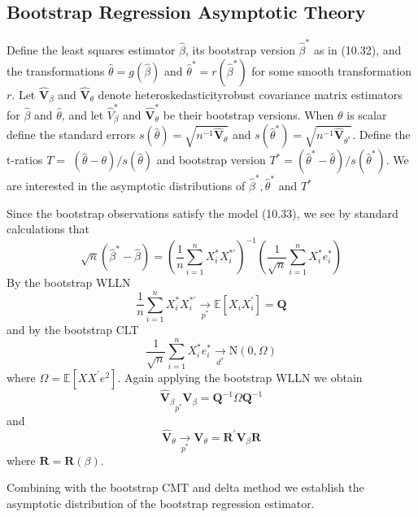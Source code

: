 \documentclass[10pt]{article}
\begin{document}
\subsection{Bootstrap Regression Asymptotic Theory}
Define the least squares estimator $\widehat{\beta}$, its bootstrap version $\widehat{\beta}^{*}$ as in (10.32), and the transformations $\widehat{\theta}=g(\widehat{\beta})$ and $\widehat{\theta}^{*}=r\left(\widehat{\beta}^{*}\right)$ for some smooth transformation $r$. Let $\widehat{\boldsymbol{V}}_{\beta}$ and $\widehat{\boldsymbol{V}}_{\theta}$ denote heteroskedasticityrobust covariance matrix estimators for $\widehat{\beta}$ and $\widehat{\theta}$, and let $\widehat{V}_{\beta}^{*}$ and $\widehat{\boldsymbol{V}}_{\theta}^{*}$ be their bootstrap versions. When $\theta$ is scalar define the standard errors $s(\widehat{\theta})=\sqrt{n^{-1} \widehat{\boldsymbol{V}}_{\theta}}$ and $s\left(\widehat{\theta}^{*}\right)=\sqrt{n^{-1} \widehat{\boldsymbol{V}}_{\theta^{*}}}$. Define the t-ratios $T=$ $(\widehat{\theta}-\theta) / s(\widehat{\theta})$ and bootstrap version $T^{*}=\left(\widehat{\theta}^{*}-\widehat{\theta}\right) / s\left(\widehat{\theta}^{*}\right)$. We are interested in the asymptotic distributions of $\widehat{\beta}^{*}, \widehat{\theta}^{*}$ and $T^{*}$

Since the bootstrap observations satisfy the model (10.33), we see by standard calculations that
$$
\sqrt{n}\left(\widehat{\beta}^{*}-\widehat{\beta}\right)=\left(\frac{1}{n} \sum_{i=1}^{n} X_{i}^{*} X_{i}^{* \prime}\right)^{-1}\left(\frac{1}{\sqrt{n}} \sum_{i=1}^{n} X_{i}^{*} e_{i}^{*}\right)
$$
By the bootstrap WLLN
$$
\frac{1}{n} \sum_{i=1}^{n} X_{i}^{*} X_{i}^{* \prime} \underset{p^{*}}{\longrightarrow} \mathbb{E}\left[X_{i} X_{i}^{\prime}\right]=\boldsymbol{Q}
$$
and by the bootstrap CLT
$$
\frac{1}{\sqrt{n}} \sum_{i=1}^{n} X_{i}^{*} e_{i}^{*} \underset{d^{*}}{\longrightarrow} \mathrm{N}(0, \Omega)
$$
where $\Omega=\mathbb{E}\left[X X^{\prime} e^{2}\right]$. Again applying the bootstrap WLLN we obtain
$$
\widehat{\boldsymbol{V}}_{\beta} \underset{p^{*}}{ } \boldsymbol{V}_{\beta}=\boldsymbol{Q}^{-1} \Omega \boldsymbol{Q}^{-1}
$$
and
$$
\widehat{\boldsymbol{V}}_{\theta} \underset{p^{*}}{\longrightarrow} \boldsymbol{V}_{\theta}=\boldsymbol{R}^{\prime} \boldsymbol{V}_{\beta} \boldsymbol{R}
$$
where $\boldsymbol{R}=\boldsymbol{R}(\beta)$.

Combining with the bootstrap CMT and delta method we establish the asymptotic distribution of the bootstrap regression estimator.
\end{document}
